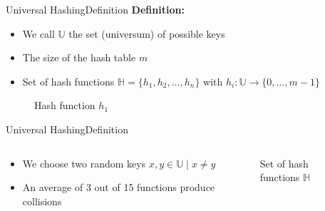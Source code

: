 \begin{frame}{Universal Hashing}{Definition}
  \textbf{Definition:}
  \begin{itemize}
    \item
      We call $\mathbb{U}$ the set (universum) of possible keys
    \item
      The size of the hash table $m$
    \item
      Set of hash functions $\mathbb{H} = \{h_1, h_2,\dots, h_n\}$ with
      $h_i: \mathbb{U} \to \{0,\dots, m - 1\}$
  \end{itemize}%
  \begin{figure}[!b]%
    \begin{adjustbox}{height=0.35\linewidth}%
    \end{adjustbox}
    \vspace*{-1.0em}%
    \caption{Hash function $h_1$}%
    \label{fig:universal_hashing:hash_function_definition}
  \end{figure}
\end{frame}


\begin{frame}{Universal Hashing}{Definition}
  \begin{columns}
    \begin{column}{0.5\linewidth}
      \begin{itemize}
        \item <1->
          We choose two random keys $x, y \in \mathbb{U} \mid x \neq 
          y$
        \item <2->
          An average of 3 out of 15 functions produce collisions
      \end{itemize}
    \end{column}
    \begin{column}{0.5\linewidth}
      \begin{figure}[!t]%
        \begin{adjustbox}{width=\linewidth}
        \end{adjustbox}
        \caption{Set of hash functions $\mathbb{H}$}%
        \label{fig:universal_hashing:hash_universe}
      \end{figure}
    \end{column}
  \end{columns}
\end{frame}

